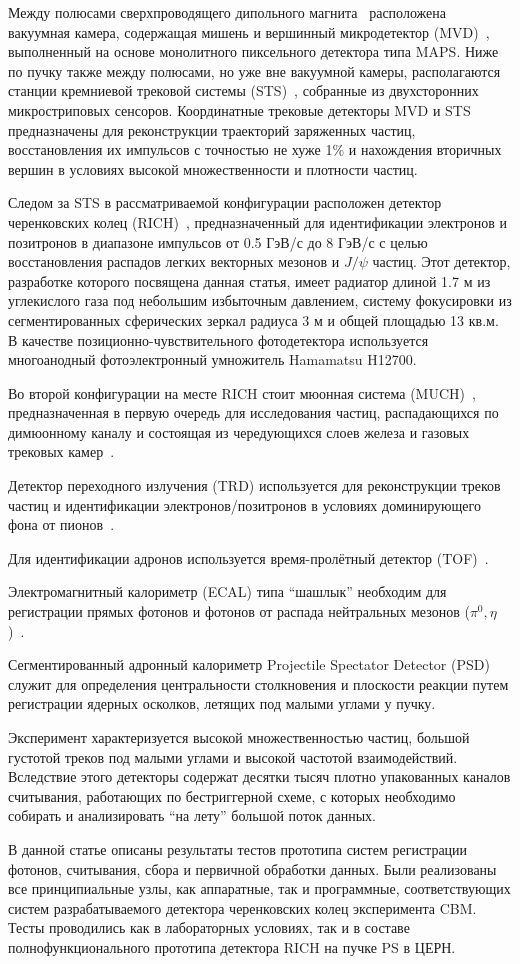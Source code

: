 Между полюсами сверхпроводящего дипольного магнита~\cite{TDR_Magnet} расположена вакуумная камера, содержащая мишень и вершинный микродетектор (MVD)~\cite{MVD_KOZIEL}, выполненный на основе монолитного пиксельного детектора типа MAPS. Ниже по пучку также между полюсами, но уже вне вакуумной камеры, располагаются станции кремниевой трековой системы (STS)~\cite{TDR_STS}, собранные из двухсторонних микростриповых сенсоров. Координатные трековые детекторы MVD и STS предназначены для реконструкции траекторий заряженных частиц, восстановления их импульсов с точностью не хуже 1\% и нахождения вторичных вершин в условиях высокой множественности и плотности частиц.

Следом за STS в рассматриваемой конфигурации расположен детектор черенковских колец (RICH)~\cite{TDR_RICH}, предназначенный для идентификации электронов и позитронов в диапазоне импульсов от 0.5 ГэВ/с до 8 ГэВ/с с целью восстановления распадов легких векторных мезонов и $ J / \psi $ частиц. Этот детектор, разработке которого посвящена данная статья, имеет радиатор длиной 1.7 м из углекислого газа под небольшим избыточным давлением, систему фокусировки из сегментированных сферических зеркал радиуса 3 м и общей площадью 13 кв.м. В качестве позиционно-чувствительного фотодетектора используется многоанодный фотоэлектронный умножитель Hamamatsu H12700.

Во второй конфигурации на месте RICH стоит мюонная система (MUCH)~\cite{TDR_MUCH}, предназначенная в первую очередь для исследования частиц, распадающихся по димюонному каналу и состоящая из чередующихся слоев железа и газовых трековых камер~\cite{GEM}.

Детектор переходного излучения (TRD) используется для реконструкции треков частиц и идентификации электронов/позитронов в условиях доминирующего фона от пионов~\cite{TRD}.

Для идентификации адронов используется время-пролётный детектор (TOF)~\cite{TDR_TOF}.

Электромагнитный калориметр (ECAL) типа ``шашлык'' необходим для регистрации прямых фотонов и фотонов от распада нейтральных мезонов ($ \pi^{0}, \eta $)~\cite{ECAL_KOROLKO}.

Сегментированный адронный калориметр Projectile Spectator Detector (PSD)~\cite{TDR_PSD} служит для определения центральности столкновения и плоскости реакции путем регистрации ядерных осколков, летящих под малыми углами у пучку.

Эксперимент характеризуется высокой множественностью частиц, большой густотой треков под малыми углами и высокой частотой взаимодействий. Вследствие этого детекторы содержат десятки тысяч плотно упакованных каналов считывания, работающих по бестриггерной схеме, с которых необходимо собирать и анализировать ``на лету'' большой поток данных.

В данной статье описаны результаты тестов прототипа систем регистрации фотонов, считывания, сбора и первичной обработки данных. Были реализованы все принципиальные узлы, как аппаратные, так и программные, соответствующих систем разрабатываемого детектора черенковских колец эксперимента CBM. Тесты проводились как в лабораторных условиях, так и в составе полнофункционального прототипа детектора RICH на пучке PS в ЦЕРН.